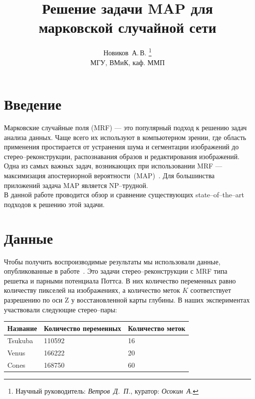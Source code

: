 \documentclass{article}
\title
    {Решение задачи MAP для марковской случайной сети}
\author
    {Новиков~А.\,В.
    \thanks{Научный руководитель: \textit{Ветров~Д.~П.}, куратор: \textit{Осокин~А.}}
    \\МГУ, ВМиК, каф. ММП
    }
\begin{document}
\maketitle

\pagebreak
\setcounter{tocdepth}{1}
 \tableofcontents
\pagebreak

\section{Введение}
Марковские случайные поля (MRF) --- это популярный подход к решению задач анализа данных. Чаще всего их используют в компьютерном зрении, где область применения простирается от устранения шума и сегментации изображений до стерео--реконструкции, распознавания образов и редактирования изображений.
Одна из самых важных задач, возникающих при использовании MRF --- максимизация апостериорной вероятности~(MAP)~\cite{ApplicationAndComp}. Для большинства приложений задача MAP является NP--трудной.\\

В данной работе проводится обзор и сравнение существующих state--of--the--art подходов к решению этой задачи.




\section{Данные}
Чтобы получить воспроизводимые результаты мы использовали данные, опубликованные в работе~\cite{Alahari}. Это задачи стерео--реконструкции с MRF типа решетка и парными потенциала Поттса. В них количество переменных равно количеству пикселей на изображениях, а количество меток $K$ соответствует разрешению по оси Z у восстановленной карты глубины. В наших экспериментах участвовали следующие стерео--пары:
\begin{center}
    \begin{tabular}{ | l | l | l |}
    \hline
    Название & Количество переменных & Количество меток\\ \hline
    Tsukuba  & 110592 & 16\\ \hline
    Venus  & 166222 & 20\\ \hline
    Cones  & 168750 & 60\\ \hline
    \end{tabular}
\end{center}
\end{document}
